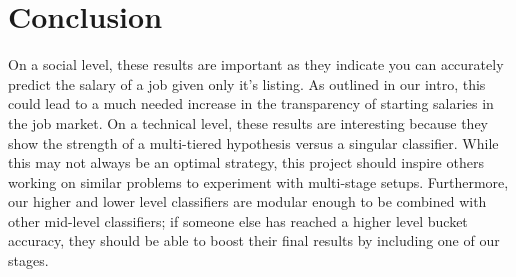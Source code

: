 \documentclass{pset}
\begin{document}
\section{Conclusion}
On a social level, these results are important as they indicate you can
accurately predict the salary of a job given only it's listing. As outlined in
our intro, this could lead to a much needed increase in the transparency of
starting salaries in the job market. On a technical level, these results are
interesting because they show the strength of a multi-tiered hypothesis versus
a singular classifier. While this may not always be an optimal strategy, this
project should inspire others working on similar problems to experiment with
multi-stage setups. Furthermore, our higher and lower level classifiers are
modular enough to be combined with other mid-level classifiers; if someone else
has reached a higher level bucket accuracy, they should be able to boost their
final results by including one of our stages.
\end{document}
